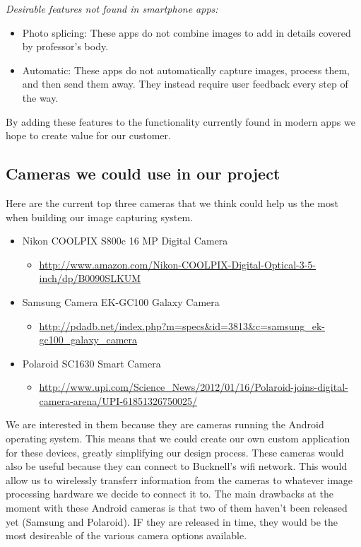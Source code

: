 \documentclass[]{article}
\begin{document}
        \emph{Desirable features not found in smartphone apps:}
        \begin{itemize} \itemsep -2pt
            \item Photo splicing: These apps do not combine images to add in details covered by professor's body.
            \item Automatic: These apps do not automatically capture images, process them, and then send them away. They instead require user feedback every step of the way.
        \end{itemize}

By adding these features to the functionality currently found in modern apps we hope to create value for our customer.


	 \subsection*{Cameras we could use in our project}
Here are the current top three cameras that we think could help us the most when building our image capturing system.

\begin{itemize}
    \item Nikon COOLPIX S800c 16 MP Digital Camera
    \begin{itemize}
        \item \url{http://www.amazon.com/Nikon-COOLPIX-Digital-Optical-3-5-inch/dp/B0090SLKUM}
    \end{itemize}
    \item Samsung Camera EK-GC100 Galaxy Camera
    \begin{itemize}
        \item \url{http://pdadb.net/index.php?m=specs&id=3813&c=samsung_ek-gc100_galaxy_camera}
    \end{itemize}
    \item Polaroid SC1630 Smart Camera
    \begin{itemize}
        \item \url{http://www.upi.com/Science_News/2012/01/16/Polaroid-joins-digital-camera-arena/UPI-61851326750025/}
    \end{itemize}
\end{itemize}

We are interested in them because they are cameras running the Android operating system. This means that we could create our own custom application for these devices, greatly simplifying our design process. These cameras would also be useful because they can connect to Bucknell's wifi network. This would allow us to wirelessly transferr information from the cameras to whatever image processing hardware we decide to connect it to. The main drawbacks at the moment with these Android cameras is that two of them haven't been released yet (Samsung and Polaroid). IF they are released in time, they would be the most desireable of the various camera options available.
\end{document}
